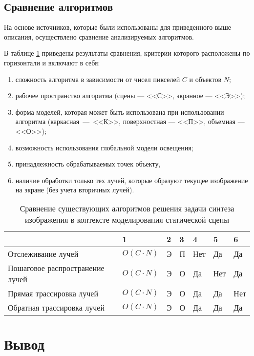 \subsection{Сравнение алгоритмов}

На основе источников, которые были использованы для приведенного выше описания, осуществлено сравнение анализируемых алгоритмов.

В таблице \ref{tab:compare} приведены результаты сравнения, критерии которого расположены по горизонтали и включают в себя:
\begin{enumerate}
	\item сложность алгоритма в зависимости от чисел пикселей $C$ и объектов $N$;
	\item рабочее пространство алгоритма (сцены --- <<С>>, экранное --- <<Э>>);
	\item форма моделей, которая может быть использована при использовании алгоритма (каркасная~---~<<К>>, поверхностная --- <<П>>, объемная --- <<О>>);
	\item возможность использования глобальной модели освещения;
	\item принадлежность обрабатываемых точек объекту,
	\item наличие обработки только тех лучей, которые образуют текущее изображение на экране (без учета вторичных лучей).
\end{enumerate}

\begin{table}[hbtp]
	\begin{center}
		\begin{flushleft}
			\caption{\label{tab:compare}Сравнение существующих алгоритмов решения задачи синтеза изображения в контексте моделирования статической сцены}
		\end{flushleft}
		\begin{tabular}{|l | l | l | l | l | l | l |} 
			\hline 
			~					& {1} & {2} & {3} & {4} & {5} & {6} \\ \hline
			Отслеживание лучей & \texttt{$O(C \cdot N)$} & Э & П  & Нет & Да & Да \\ \hline
			Пошаговое распространение лучей & \texttt{$O(C \cdot N)$} & Э & О & Да & Нет & Да \\ \hline
			Прямая трассировка лучей & \texttt{$O(C \cdot N)$} & Э & О & Да & Да & Нет \\ \hline
			Обратная трассировка лучей & \texttt{$O(C \cdot N)$} & Э & О & Да & Да & Да \\ \hline
		\end{tabular}
	\end{center}
\end{table}

\section*{Вывод}

